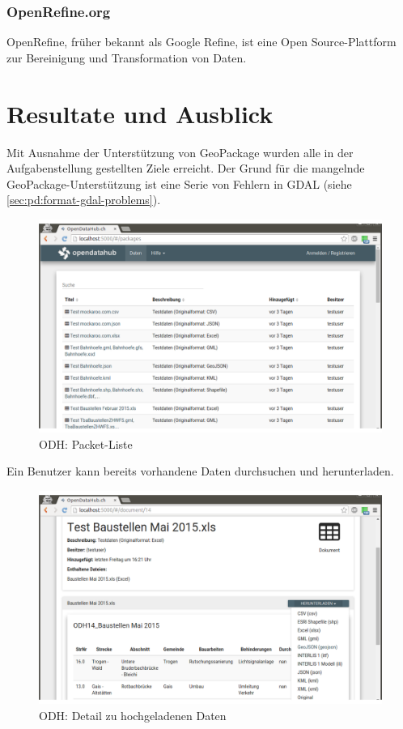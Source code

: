 \subsection{OpenRefine.org}
OpenRefine, früher bekannt als Google Refine, ist eine Open Source-Plattform zur Bereinigung und Transformation von Daten.

\chapter{Resultate und Ausblick}
Mit Ausnahme der Unterstützung von GeoPackage wurden alle in der Aufgabenstellung gestellten Ziele erreicht. Der Grund für die mangelnde GeoPackage-Unterstützung ist eine Serie von Fehlern in GDAL (siehe \cref{sec:pd:format-gdal-problems}).

\begin{figure}[H]
    \centering
    \includegraphics[width=2\linewidth/3]{fig/odh-package-list}
    \caption{ODH: Packet-Liste}
\end{figure}

Ein Benutzer kann bereits vorhandene Daten durchsuchen und herunterladen. 

\begin{figure}[H]
    \centering
    \includegraphics[width=2\linewidth/3]{fig/odh-document-detail}
    \caption{ODH: Detail zu hochgeladenen Daten}
\end{figure}

